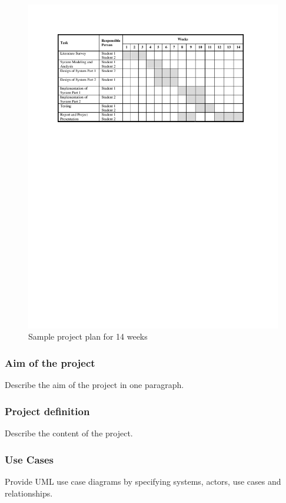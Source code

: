 \documentclass{mefsdp}
\begin{document}
	\begin{figure}[t]
		\centering
		\includegraphics[scale=.85]{../figures/gantt}
		\caption{Sample project plan for 14 weeks}
	\end{figure}
	\newpage
	\subsubsection{Aim of the project}
	Describe the aim of the project in one paragraph.
	
	\subsubsection{Project definition}
	Describe the content of the project. 
	
	\subsubsection{Use Cases}
	Provide UML use case diagrams by specifying systems, actors, use cases and relationships. \cite{kahneman2011thinking}
	
\end{document}
